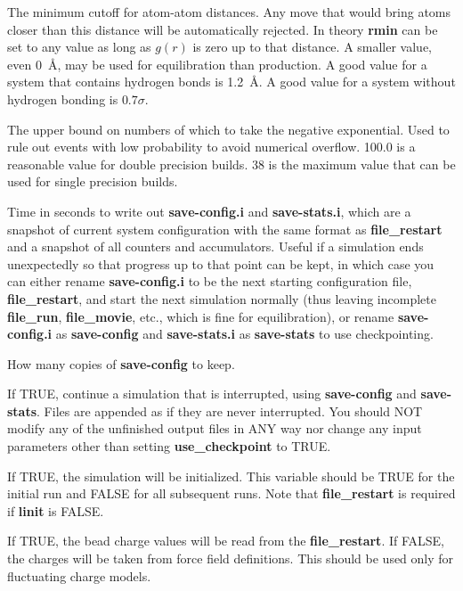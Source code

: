 \documentclass[12pt,letterpaper]{article}
\begin{document}
 The minimum cutoff for atom-atom
distances. Any move that would bring atoms closer than this
distance will be automatically rejected. In theory {\bf
  rmin} can be set to any value as long as $g(r)$ is zero up
to that distance. A smaller value, even 0~{\AA}, may be used
for equilibration than production. A good value for a system
that contains hydrogen bonds is 1.2~\AA. A good value for a
system without hydrogen bonding is $0.7\sigma$.

 The upper bound on numbers of which
to take the negative exponential. Used to rule out events
with low probability to avoid numerical overflow. 100.0 is a
reasonable value for double precision builds. 38 is the
maximum value that can be used for single precision builds.

 Time in seconds to
write out {\bf save-config.i} and {\bf save-stats.i}, which
are a snapshot of current system configuration with the same
format as {\bf file\_restart} and a snapshot of all counters
and accumulators. Useful if a simulation ends unexpectedly
so that progress up to that point can be kept, in which case
you can either rename {\bf save-config.i} to be the next
starting configuration file, {\bf file\_restart}, and start
the next simulation normally (thus leaving incomplete {\bf
  file\_run}, {\bf file\_movie}, etc., which is fine for
equilibration), or rename {\bf save-config.i} as {\bf
  save-config} and {\bf save-stats.i} as {\bf save-stats} to
use checkpointing.

 How many copies of {\bf save-config} to keep.

 If TRUE, continue a
simulation that is interrupted, using {\bf save-config} and
{\bf save-stats}. Files are appended as if they are never
interrupted. You should NOT modify any of the unfinished
output files in ANY way nor change any input parameters
other than setting \textbf{use\_checkpoint} to TRUE.

 If TRUE, the simulation will be
initialized. This variable should be TRUE for the initial
run and FALSE for all subsequent runs. Note that {\bf
  file\_restart} is required if {\bf linit} is FALSE.

 If TRUE, the bead charge values will
be read from the {\bf file\_restart}. If FALSE, the charges
will be taken from force field definitions. This should be
used only for fluctuating charge models.
\end{document}
